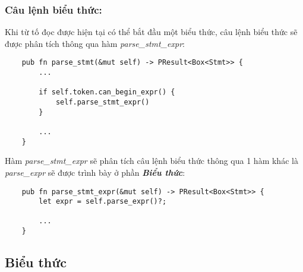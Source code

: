 \subsubsection{Câu lệnh biểu thức:} 
Khi từ tố đọc được hiện tại có thể bắt đầu một biểu thức, câu lệnh biểu thức sẽ được phân tích thông qua hàm \textit{parse\_stmt\_expr}:
\begin{lstlisting}
    pub fn parse_stmt(&mut self) -> PResult<Box<Stmt>> {
        ...
    
        if self.token.can_begin_expr() {
            self.parse_stmt_expr()
        }
        
        ...
    }
\end{lstlisting}
Hàm \textit{parse\_stmt\_expr} sẽ phân tích câu lệnh biểu thức thông qua 1 hàm khác là \textit{parse\_expr} sẽ được trình bày ở phần \textbf{\textit{Biểu thức}}:
\begin{lstlisting}
    pub fn parse_stmt_expr(&mut self) -> PResult<Box<Stmt>> {
        let expr = self.parse_expr()?;
        
        ...
    }
\end{lstlisting}

\subsection{Biểu thức}


